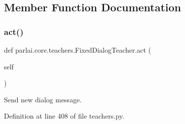 \subsection{Member Function Documentation}
\mbox{\label{classparlai_1_1core_1_1teachers_1_1FixedDialogTeacher_a759b2dcb341b657fda29c71a7a5354b4}} 
\subsubsection{\texorpdfstring{act()}{act()}}
{\footnotesize\ttfamily def parlai.\+core.\+teachers.\+Fixed\+Dialog\+Teacher.\+act (\begin{DoxyParamCaption}\item[{}]{self }\end{DoxyParamCaption})}

\begin{DoxyVerb}Send new dialog message.
\end{DoxyVerb}
 

Definition at line 408 of file teachers.\+py.


